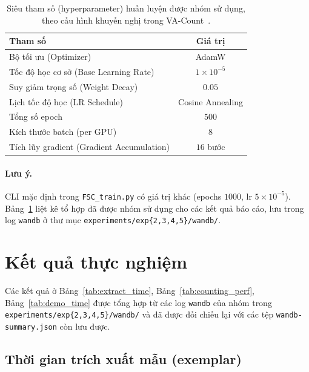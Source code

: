 \documentclass[a4paper,12pt]{report}
\numberwithin{figure}{chapter}
\numberwithin{table}{chapter}
\begin{document}
\begin{table}[H]
\centering
\renewcommand{\arraystretch}{1.2}
\begin{tabular}{|l|c|}
\hline
\rowcolor[HTML]{EFEFEF}
\textbf{Tham số} & \textbf{Giá trị} \\
\hline
Bộ tối ưu (Optimizer) & AdamW \\
\hline
Tốc độ học cơ sở (Base Learning Rate) & $1{\times}10^{-5}$ \\
\hline
Suy giảm trọng số (Weight Decay) & $0.05$ \\
\hline
Lịch tốc độ học (LR Schedule) & Cosine Annealing \\
\hline
Tổng số epoch & $500$ \\
\hline
Kích thước batch (per GPU) & $8$ \\
\hline
Tích lũy gradient (Gradient Accumulation) & $16$ bước \\
\hline
\end{tabular}
\caption{Siêu tham số (hyperparameter) huấn luyện được nhóm sử dụng, theo cấu hình khuyến nghị trong VA-Count~\cite{vacount}.}
\label{tab:hyperparams}
\end{table}

\paragraph{Lưu ý.}
CLI mặc định trong \texttt{FSC\_train.py} có giá trị khác
(epochs $1000$, lr $5{\times}10^{-5}$).
Bảng~\ref{tab:hyperparams} liệt kê tổ hợp đã được nhóm sử dụng cho các
kết quả báo cáo, lưu trong log \texttt{wandb} ở thư mục
\texttt{experiments/exp\{2,3,4,5\}/wandb/}.

\section{Kết quả thực nghiệm}
\label{sec:results}

Các kết quả ở Bảng~\ref{tab:extract_time}, Bảng~\ref{tab:counting_perf},
Bảng~\ref{tab:demo_time} được tổng hợp từ các log \texttt{wandb} của nhóm
trong \mbox{\texttt{experiments/exp\{2,3,4,5\}/wandb/}}
và đã được đối chiếu lại với các tệp \texttt{wandb-summary.json} còn lưu được.

\subsection{Thời gian trích xuất mẫu (exemplar)}
\end{document}
